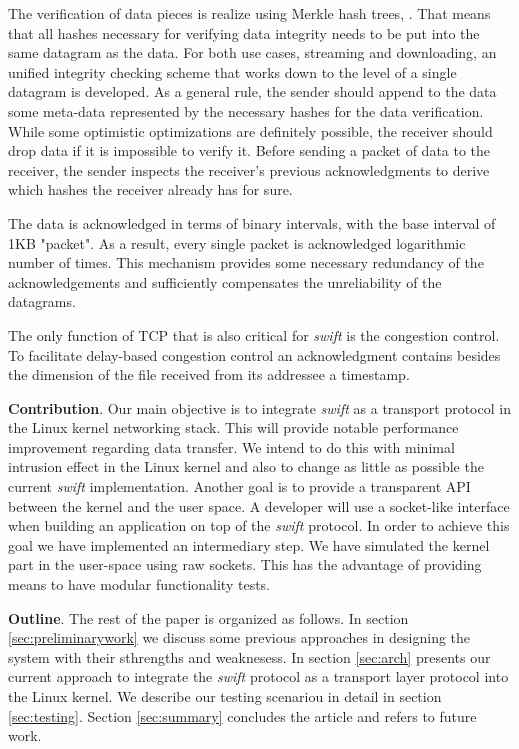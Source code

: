 The verification of data pieces is realize using Merkle hash trees\cite{merkle}, \cite{merkle-ext}. That means that all
hashes necessary for verifying data integrity needs to be put into the same datagram as the data. For both use cases,
streaming and downloading, an unified  integrity checking scheme that works down to the level of a single datagram is
developed. As a general rule, the sender should append to the data some meta-data represented by the necessary hashes
for the data verification. While some optimistic optimizations are definitely possible, the receiver should drop data if
it is impossible to verify it. Before sending a packet of data to the receiver, the sender inspects the receiver's
previous acknowledgments to derive which hashes the receiver already has for sure. 

The data is acknowledged in terms of binary intervals, with the base interval of 1KB "packet". As a result, every 
single packet is acknowledged logarithmic number of times. This mechanism provides some necessary redundancy of the
acknowledgements and sufficiently compensates the unreliability of the datagrams. 

The only function of TCP that is also critical for \emph{swift} is the congestion control. To facilitate delay-based 
congestion control an acknowledgment contains besides the dimension of the file received from its addressee a timestamp.


\textbf{Contribution}. Our main objective is to integrate \emph{swift} as a transport protocol in the Linux kernel 
networking stack. This will provide notable performance improvement regarding data transfer. We intend to do this with 
minimal intrusion effect in the Linux kernel and also to change as little as possible the current \emph{swift} 
implementation. Another goal is to provide a transparent API between the kernel and the user space. A developer will use 
a socket-like interface when building an application on top of the \emph{swift} protocol. In order to achieve this goal
we have implemented an intermediary step. We have simulated the kernel part in the user-space using raw sockets. This 
has the advantage of providing means to have modular functionality tests.


\textbf{Outline}. The rest of the paper is organized as follows. In section \ref{sec:preliminarywork} we discuss some
previous approaches in designing the system with their sthrengths and weaknesess. In section \ref{sec:arch}
 presents our current approach to integrate the \emph{swift} protocol as a transport layer protocol into the Linux
kernel. 
We describe our testing scenariou in detail in section \ref{sec:testing}. Section
\ref{sec:summary} concludes the article and refers to future work.
